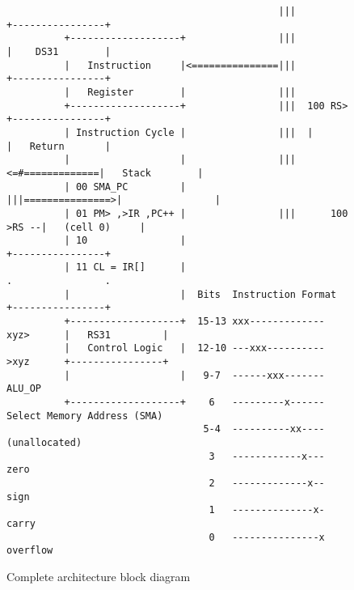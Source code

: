 \begin{figure*}[h!]
\begin{lstlisting}
                                               |||                +----------------+
          +-------------------+                |||                |    DS31        |
          |   Instruction     |<===============|||                +----------------+
          |   Register        |                |||
          +-------------------+                |||  100 RS>       +----------------+
          | Instruction Cycle |                |||  |             |   Return       |
          |                   |                |||<=#=============|   Stack        |
          | 00 SMA_PC         |                |||===============>|                |
          | 01 PM> ,>IR ,PC++ |                |||      100 >RS --|   (cell 0)     |
          | 10                |                                   +----------------+
          | 11 CL = IR[]      |                                   .                .
          |                   |  Bits  Instruction Format         +----------------+
          +-------------------+  15-13 xxx------------- xyz>      |   RS31         |
          |   Control Logic   |  12-10 ---xxx---------- >xyz      +----------------+
          |                   |   9-7  ------xxx------- ALU_OP      
          +-------------------+    6   ---------x------ Select Memory Address (SMA)
                                  5-4  ----------xx---- (unallocated)
                                   3   ------------x--- zero
                                   2   -------------x-- sign
                                   1   --------------x- carry
                                   0   ---------------x overflow
\end{lstlisting}
\caption[Architecture Block Diagram]{Complete architecture block diagram}
\end{figure*}



